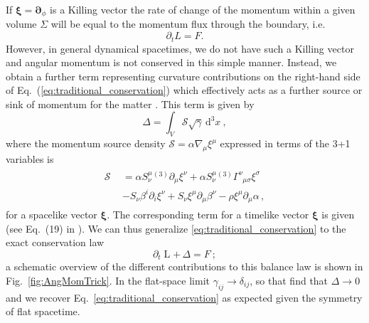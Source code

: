 \documentclass[11pt]{report}  %
\newcommand{\bs}{\boldsymbol}
\newcommand{\dd}{\mathrm{d}}
\newcommand{\bs}{\boldsymbol}
\begin{document}
If $\bs{\xi} = \bs{\partial}_\phi$ is a Killing vector the rate of change of the momentum
within a given volume $\Sigma$ will be equal to the momentum flux through the
boundary, i.e.
\begin{equation} \label{eq:traditional_conservation}
    \partial_t {L} = {F}.
\end{equation}
However, in general dynamical spacetimes, we do not have such
a Killing vector and angular momentum is not conserved in this simple manner. 
Instead, we obtain a further term representing curvature contributions on the right-hand side of Eq.~(\ref{eq:traditional_conservation})
which effectively acts as a further source or sink of momentum for the matter \cite{Croft:2022gks,Clough:2021qlv}. This term is given by
\begin{equation}
    \mathbin{{\Delta = \int_{V} \mathcal{S} \sqrt{\gamma }\,
    \dd^3x}}~,
\end{equation}
where the momentum source density $\mathcal{S}=\alpha\nabla_{\mu}\xi^{\mu}$ expressed in terms
of the 3+1 variables is
\begin{align}
    \begin{split}\mathcal{S} &= \alpha S^\mu_{\nu}{}^{(3)}\partial_\mu \xi^\nu + \alpha S^\mu_{\nu} {}^{(3)}\Gamma^\nu_{\,\,\,\mu \sigma} \xi^\sigma \\ \quad &- S_\nu \beta^i \partial_i \xi^\nu  + S_\nu \xi^\mu \partial_\mu \beta^\nu - \rho \xi^\mu \partial_\mu \alpha\,, \end{split}
\end{align}
for a spacelike vector $\bs\xi$. The corresponding term
for a timelike vector $\bs\xi$ is given (see Eq.~(19) in \cite{Clough:2021qlv}).
We can thus generalize \cref{eq:traditional_conservation} to the exact conservation law
\begin{equation}
    \partial_t\mathbin{{L}} +\,
    \mathbin{{\Delta}} =
    \mathbin{F}~;\label{eqn:conserved_ang}
\end{equation} 
a schematic overview of the different contributions to this balance
law is shown in Fig.~\ref{fig:AngMomTrick}. In the flat-space limit $\gamma_{ij}
\rightarrow \delta_{ij}$, so that
find that ${{\Delta}}\rightarrow 0$ and we recover Eq.~\ref{eq:traditional_conservation} as expected given the
symmetry of flat spacetime.
\end{document}
